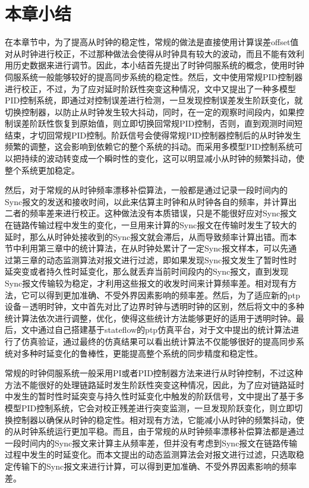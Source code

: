 \section{本章小结}
在本章节中，为了提高从时钟的稳定性，常规的做法是直接使用计算误差offset值对从时钟进行校正，不过那种做法会使得从时钟具有较大的波动，而且不能有效利用历史数据来进行调节。因此，本小结首先提出了时钟伺服系统的概念，使用时钟伺服系统一般能够较好的提高同步系统的稳定性。然后，文中使用常规PID控制器进行校正，不过，为了应对延时阶跃性突变这种情况，文中又提出了一种多模型PID控制系统，即通过对控制误差进行检测，一旦发现控制误差发生阶跃变化，就切换控制器，以防止从时钟发生较大抖动，同时，在一定的观察时间段内，如果控制误差阶跃性恢复到原始值，则立即切换回常规PID控制，否则，直到观测时间短结束，才切回常规PID控制。阶跃信号会使得常规PID控制器控制后的从时钟发生频繁的调整，这会影响到依赖它的整个系统的抖动。而采用多模型PID控制系统可以把持续的波动转变成一个瞬时性的变化，这可以明显减小从时钟的频繁抖动，使整个系统更加稳定。

然后，对于常规的从时钟频率漂移补偿算法，一般都是通过记录一段时间内的Sync报文的发送和接收时间，以此来估算主时钟和从时钟各自的频率，并计算出二者的频率差来进行校正。这种做法没有本质错误，只是不能很好应对Sync报文在链路传输过程中发生的变化，一旦用来计算的Sync报文在传输时发生了较大的延时，那么从时钟处接收到的Sync报文就会滞后，从而导致频率计算出错。而本节中利用第三章中的统计算法，在从时钟处累计了一定Sync报文样本，可以先通过第三章的动态监测算法对报文进行过滤，即如果发现Sync报文发生了暂时性时延突变或者持久性时延变化，那么就丢弃当前时间段内的Sync报文，直到发现Sync报文传输较为稳定，才利用这些报文的收发时间来计算频率差。相对现有方法，它可以得到更加准确、不受外界因素影响的频率差。然后，为了适应新的ptp设备－透明时钟，文中首先对比了边界时钟与透明时钟的区别，然后将文中的多种统计算法依次进行调整，优化，使得这些统计方法能够更好的适用于透明时钟。最后，文中通过自己搭建基于stateflow的ptp仿真平台，对于文中提出的统计算法进行了仿真验证，通过最终的仿真结果可以看出统计算法不仅能够很好的提高同步系统对多种时延变化的鲁棒性，更能提高整个系统的同步精度和稳定性。

常规的时钟伺服系统一般采用PI或者PID控制器方法来进行从时钟控制，不过这种方法不能很好的处理链路延时发生阶跃性突变这种情况，因此，为了应对链路延时中发生的暂时性时延突变与持久性时延变化中触发的阶跃信号，文中提出了基于多模型PID控制系统，它会对校正残差进行突变监测，一旦发现阶跃变化，则立即切换控制器以确保从时钟的稳定性。相对现有方法，它能减小从时钟的频繁抖动，使的从时钟系统运行更加平稳。而且，由于常规的从时钟频率漂移补偿算法都是通过一段时间内的Sync报文来计算主从频率差，但并没有考虑到Sync报文在链路传输过程中发生的时延变化。而本文提出的动态监测算法会对报文进行过滤，只选取稳定传输下的Sync报文来进行计算，可以得到更加准确、不受外界因素影响的频率差。



